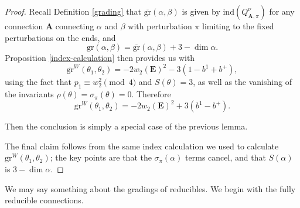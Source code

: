\documentclass[10pt,a4paper]{amsart}
\theoremstyle{definition}
\theoremstyle{remark}
\numberwithin{figure}{qchap}
\begin{document}
\begin{proof}Recall Definition \ref{grading} that $\overline{\text{gr}}(\alpha, \beta)$ is given by $\text{ind}(Q^\nu_{\mathbf{A},\pi})$ for any connection $\mathbf{A}$ connecting $\alpha$ and $\beta$ with perturbation $\pi$ limiting to the fixed perturbations on the ends, and $$\text{gr}(\alpha, \beta) = \overline{\text{gr}}(\alpha, \beta) + 3 - \dim \alpha.$$
\noindent
Proposition \ref{index-calculation} then provides us with $$\overline{\text{gr}}^W(\theta_1, \theta_2) = -2w_2(\mathbf{E})^2  - 3(1-b^1+b^+),$$ using the fact that $p_1 \equiv w_2^2 \pmod 4$ and $S(\theta) = 3$, as well as the vanishing of the invariants $\rho(\theta) = \sigma_{\pi}(\theta) = 0$. Therefore $$\text{gr}^W(\theta_1, \theta_2) = -2w_2(\mathbf{E})^2 + 3(b^1 -b^+).$$

Then the conclusion is simply a special case of the previous lemma. 

The final claim follows from the same index calculation we used to calculate $\text{gr}^W(\theta_1, \theta_2)$; the key points are that the $\sigma_\pi(\alpha)$ terms cancel, and that 
$S(\alpha)$ is $3 - \dim \alpha.$
\end{proof}

We may say something about the gradings of reducibles. We begin with the fully reducible connections.
\end{document}
